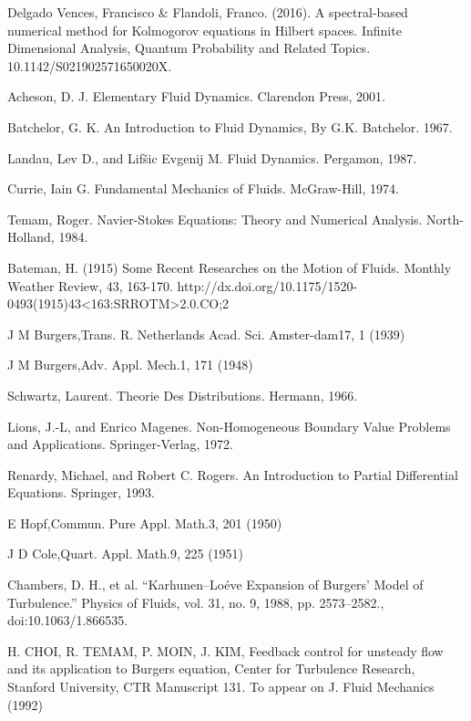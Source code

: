 
\begin{thebibliography}{X}

 Delgado Vences, Francisco \& Flandoli, Franco. (2016). A spectral-based numerical method for Kolmogorov equations in Hilbert spaces. Infinite Dimensional Analysis, Quantum Probability and Related Topics. 10.1142/S021902571650020X. 

 Acheson, D. J. Elementary Fluid Dynamics. Clarendon Press, 2001.

 Batchelor, G. K. An Introduction to Fluid Dynamics, By G.K. Batchelor. 1967.

 Landau, Lev D., and Lifšic Evgenij M. Fluid Dynamics. Pergamon, 1987.

 Currie, Iain G. Fundamental Mechanics of Fluids. McGraw-Hill, 1974.

 Temam, Roger. Navier-Stokes Equations: Theory and Numerical Analysis. North-Holland, 1984.

 Bateman, H. (1915) Some Recent Researches on the Motion of Fluids. Monthly Weather Review, 43, 163-170. http://dx.doi.org/10.1175/1520-0493(1915)43<163:SRROTM>2.0.CO;2 

 J M Burgers,Trans. R. Netherlands Acad. Sci. Amster-dam17, 1 (1939)

 J M Burgers,Adv. Appl. Mech.1, 171 (1948)

 Schwartz, Laurent. Theorie Des Distributions. Hermann, 1966.

 Lions, J.-L, and Enrico Magenes. Non-Homogeneous Boundary Value Problems and Applications. Springer-Verlag, 1972.

 Renardy, Michael, and Robert C. Rogers. An Introduction to Partial Differential Equations. Springer, 1993.	

 E Hopf,Commun. Pure Appl. Math.3, 201 (1950)

 J D Cole,Quart. Appl. Math.9, 225 (1951)

 Chambers, D. H., et al. “Karhunen–Loéve Expansion of Burgers’ Model of Turbulence.” Physics of Fluids, vol. 31, no. 9, 1988, pp. 2573–2582., doi:10.1063/1.866535.

 H. CHOI, R. TEMAM, P. MOIN, J. KIM, Feedback control for unsteady flow and its application to Burgers equation, Center for Turbulence Research, Stanford University, CTR Manuscript 131. To appear on J. Fluid Mechanics (1992)


\end{thebibliography}
